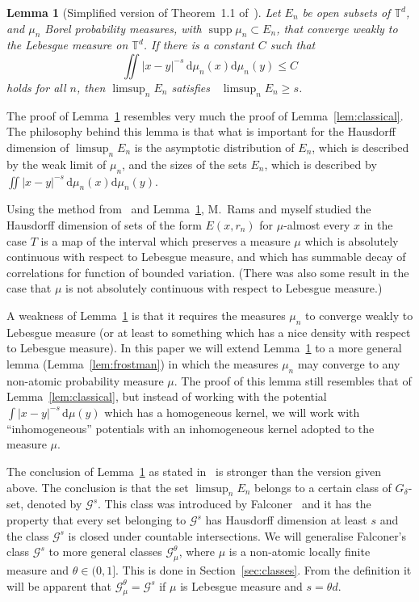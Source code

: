 \documentclass[11pt]{article}
\newtheorem{lemm}[theo]{Lemma}
\theoremstyle{definition}
\numberwithin{equation}{section}
\numberwithin{figure}{section}
\numberwithin{table}{section}
\DeclareMathOperator{\dimh}{dim_H}
\DeclareMathOperator{\supp}{supp}
\newcommand*{\dd}{\mathrm{d}}
\begin{document}
\begin{lemm}[Simplified version of Theorem~1.1 of~\cite{perssonreeve}] \label{lem:perssonreeve}
Let $E_n$ be open subsets of\/ $\mathbb{T}^d$, and $\mu_n$ Borel probability measures, with $\supp \mu_n \subset E_n$, that converge weakly to the Lebesgue measure on $\mathbb{T}^d$. If there is a constant $C$ such that
\begin{equation}\label{eq:bounded_energy}
\iint |x - y|^{-s} \, \dd \mu_n (x) \dd \mu_n (y)
\leq C
\end{equation}
holds for all $n$, then $\limsup_n E_n$ satisfies $\dimh \limsup_n E_n \geq s$.
\end{lemm}

The proof of Lemma~\ref{lem:perssonreeve} resembles very much the proof of Lemma~\ref{lem:classical}. The philosophy behind this lemma is that what is important for the Hausdorff dimension of $\limsup_n E_n$ is the asymptotic distribution of $E_n$, which is described by the weak limit of $\mu_n$, and the sizes of the sets $E_n$, which is described by $\iint |x-y|^{-s} \, \dd\mu_n (x) \dd\mu_n (y)$.

Using the method from~\cite{persson} and Lemma~\ref{lem:perssonreeve}, M.~Rams and myself studied the Hausdorff dimension of sets of the form $E(x,r_n)$ for $\mu$-almost every $x$ in the case $T$ is a map of the interval which preserves a measure $\mu$ which is absolutely continuous with respect to Lebesgue measure, and which has summable decay of correlations for function of bounded variation. (There was also some result in the case that $\mu$ is not absolutely continuous with respect to Lebesgue measure.)

A weakness of Lemma~\ref{lem:perssonreeve} is that it requires the measures $\mu_n$ to converge weakly to Lebesgue measure (or at least to something which has a nice density with respect to Lebesgue measure). In this paper we will extend Lemma~\ref{lem:perssonreeve} to a more general lemma (Lemma~\ref{lem:frostman}) in which the measures $\mu_n$ may converge to any non-atomic probability measure $\mu$. The proof of this lemma still resembles that of Lemma~\ref{lem:classical}, but instead of working with the potential $\int |x-y|^{-s} \,
\dd\mu (y)$ which has a homogeneous kernel, we will work with ``inhomogeneous'' potentials with an inhomogeneous kernel adopted to the measure $\mu$.

The conclusion of Lemma~\ref{lem:perssonreeve} as stated in~\cite{perssonreeve} is stronger than the version given above. The conclusion is that the set $\limsup_n E_n$ belongs to a certain class of $G_\delta$-set, denoted by $\mathscr{G}^s$. This class was introduced by Falconer~\cite{falconer1, falconer2} and it has the property that every set belonging to $\mathscr{G}^s$ has Hausdorff dimension at least $s$ and the class $\mathscr{G}^s$ is closed under countable intersections. We will generalise Falconer's class $\mathscr{G}^s$ to more general classes $\mathscr{G}_\mu^\theta$, where $\mu$ is a non-atomic locally finite measure and $\theta \in (0,1]$. This is done in Section~\ref{sec:classes}. From the definition it will be apparent that $\mathscr{G}_\mu^\theta =
\mathscr{G}^s$ if $\mu$ is Lebesgue measure and $s = \theta d$.
\end{document}
